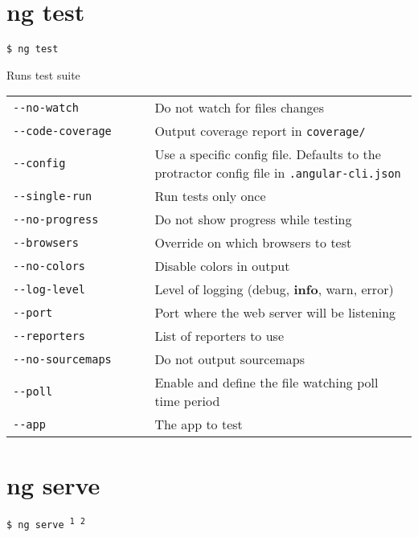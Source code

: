 \documentclass[8pt]{extarticle} %
\begin{document}
\begin{multicols}{3}
\section*{ng test}

  \vspace{1ex}
  {\tt \$ ng test \itt{[options...]}}

  \vspace{0.6ex}

  {\small Runs test suite}

  \vspace{0.6ex}

  \begin{tabular}{L{0.35\linewidth} L{0.65\linewidth}}
    \tt -{}-no-watch  & \small Do not watch for files changes \\
    \tt -{}-code-coverage  & \small Output coverage report in {\tt coverage/} \\
    \tt -{}-config  & \small Use a specific config file. Defaults to the protractor config file in {\tt .angular-cli.json} \\
    \tt -{}-single-run  & \small Run tests only once \\
    \tt -{}-no-progress  & \small Do not show progress while testing \\
    \tt -{}-browsers  & \small Override on which browsers to test \\
    \tt -{}-no-colors  & \small Disable colors in output \\
    \tt -{}-log-level  & \small Level of logging (debug, {\bf info}, warn, error) \\
    \tt -{}-port  & \small Port where the web server will be listening \\
    \tt -{}-reporters  & \small List of reporters to use \\
    \tt -{}-no-sourcemaps  & \small Do not output sourcemaps \\
    \tt -{}-poll  & \small Enable and define the file watching poll time period \\
    \tt -{}-app  & \small The app to test 
  \end{tabular}

\section*{ng serve}

  \vspace{1ex}
  {\tt \$ ng serve {\small {}\textsuperscript{1} \textsuperscript{2}}}


\end{multicols}
\end{document}
